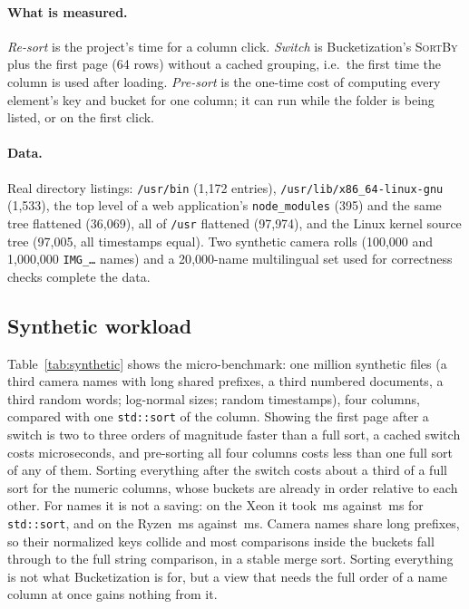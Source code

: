 \documentclass[11pt]{article}
\theoremstyle{definition}
\begin{document}
\paragraph{What is measured.} \emph{Re-sort} is the project's time for a
column click. \emph{Switch} is Bucketization's \textsc{SortBy} plus the first
page (64 rows) without a cached grouping, i.e.\ the first time the column is
used after loading. \emph{Pre-sort} is the one-time cost of computing every
element's key and bucket for one column; it can run while the folder is being
listed, or on the first click.

\paragraph{Data.} Real directory listings: \texttt{/usr/bin} (1{,}172
entries), \texttt{/usr/lib/x86\_64-linux-gnu} (1{,}533), the top level of a web
application's \texttt{node\_modules} (395) and the same tree flattened
(36{,}069), all of \texttt{/usr} flattened (97{,}974), and the Linux kernel
source tree (97{,}005, all timestamps equal). Two synthetic camera rolls
(100{,}000 and 1{,}000{,}000 \texttt{IMG\_\ldots} names) and a 20{,}000-name
multilingual set used for correctness checks complete the data.

\subsection{Synthetic workload}

Table~\ref{tab:synthetic} shows the micro-benchmark: one million synthetic
files (a third camera names with long shared prefixes, a third numbered
documents, a third random words; log-normal sizes; random timestamps), four
columns, compared with one \texttt{std::sort} of the column. Showing the first
page after a switch is two to three orders of magnitude faster than a full sort,
a cached switch costs microseconds, and pre-sorting all four columns costs
less than one full sort of any of them. Sorting everything after the switch
costs about a third of a full sort for the numeric columns, whose buckets are
already in order relative to each other. For names it is not a saving: on the
Xeon it took \,ms against
\,ms for \texttt{std::sort}, and on the
Ryzen \,ms against
\,ms. Camera names share long prefixes,
so their normalized keys collide and most comparisons inside the buckets fall
through to the full string comparison, in a stable merge sort. Sorting
everything is not what Bucketization is for, but a view that needs the full
order of a name column at once gains nothing from it.
\end{document}
